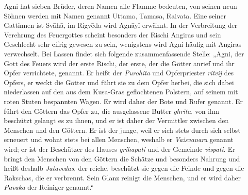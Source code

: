 \documentclass{article}
\begin{document}
Agni hat sieben Brüder, deren Namen alle Flamme bedeuten, von seinen neun Söhnen werden mit Namen genannt Uttama, Tamasa, Raivata. Eine seiner Gattinnen ist Sv\={a}h\={a}, im Rigv\={e}da wird Agn\={a}y\={i} erwähnt. In der Verbreitung der Verehrung des Feuergottes scheint besonders der Rischi Angiras und sein Geschlecht sehr eifrig gewesen zu sein, wenigstens wird Agni häufig mit Angiras verwechselt. Bei Lassen findet sich folgende zusammenfassende Stelle: „Agni, der Gott des Feuers wird der erste Rischi, der erste, der die Götter anrief und ihr Opfer verrichtete, genannt. Er heißt der \emph{Purohita} und Opferpriester \emph{ritvij} des Opfers, er weckt die Götter und führt sie zu dem Opfer herbei, die sich dabei niederlassen auf den aus dem Kusa-Gras geflochtenen Polstern, auf seinem mit roten Stuten bespannten Wagen. Er wird daher der Bote und Rufer genannt. Er führt den Göttern das Opfer zu, die ausgelassene Butter \emph{ghrita}, von ihm beschützt gelangt es zu ihnen, und er ist daher der Vermittler zwischen den Menschen und den Göttern. Er ist der junge, weil er sich stets durch sich selbst erneuert und wohnt stets bei allen Menschen, weshalb er \emph{Vaisvanara} genannt wird; er ist der Beschützer des Hauses \emph{grihapati} und der Gemeinde \emph{vispati}. Er bringt den Menschen von den Göttern die Schätze und besonders Nahrung und heißt deshalb \emph{Jatavedas}, der reiche, beschützt sie gegen die Feinde und gegen die Rakschas, die er verbrennt. Sein Glanz reinigt die Menschen, und er wird daher \emph{Pavaka} der Reiniger genannt.“
\end{document}
